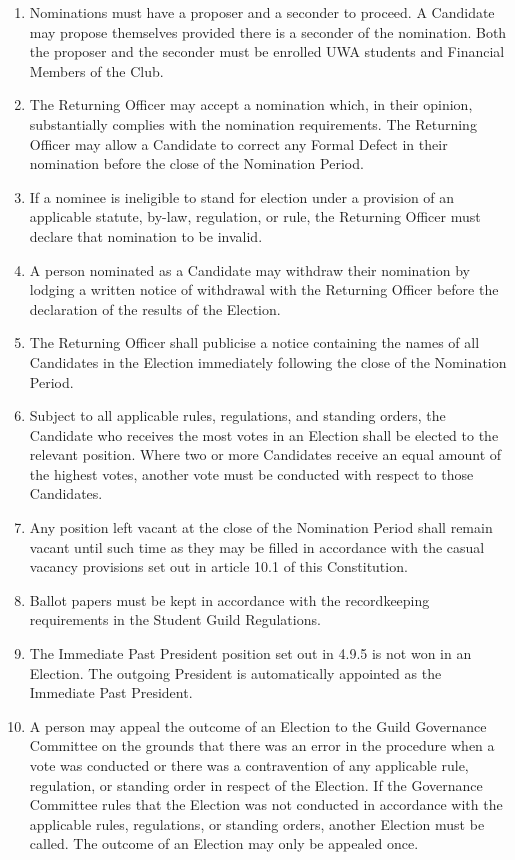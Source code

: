 \documentclass[12pt]{article}
\begin{document}
\begin{enumerate}[label=7.\arabic*]
\item Nominations must have a proposer and a seconder to proceed. A Candidate may
propose themselves provided there is a seconder of the nomination. Both the
proposer and the seconder must be enrolled UWA students and Financial
Members of the Club.
\item The Returning Officer may accept a nomination which, in their opinion, substantially complies with the nomination requirements. The Returning Officer may allow a Candidate to correct any Formal Defect in their nomination before the close of the Nomination Period.
    \item If a nominee is ineligible to stand for election under a provision of an applicable statute, by-law, regulation, or rule, the Returning Officer must declare that nomination to be invalid.
    \item A person nominated as a Candidate may withdraw their nomination by lodging a written notice of withdrawal with the Returning Officer before the declaration of the results of the Election.
    \item The Returning Officer shall publicise a notice containing the names of all Candidates in the Election immediately following the close of the Nomination Period.
    \item Subject to all applicable rules, regulations, and standing orders, the Candidate who receives the most votes in an Election shall be elected to the relevant position. Where two or more Candidates receive an equal amount of the highest votes, another vote must be conducted with respect to those Candidates.
    \item Any position left vacant at the close of the Nomination Period shall remain vacant until such time as they may be filled in accordance with the casual vacancy provisions set out in article 10.1 of this Constitution.
    \item Ballot papers must be kept in accordance with the recordkeeping requirements in the Student Guild Regulations.
    \item The Immediate Past President position set out in 4.9.5 is not won in an Election. The outgoing President is automatically appointed as the Immediate Past President.
    \item A person may appeal the outcome of an Election to the Guild Governance Committee on the grounds that there was an error in the procedure when a vote was conducted or there was a contravention of any applicable rule, regulation, or standing order in respect of the Election. If the Governance Committee rules that the Election was not conducted in accordance with the applicable rules, regulations, or standing orders, another Election must be called. The outcome of an Election may only be appealed once.
\end{enumerate}
\end{document}
